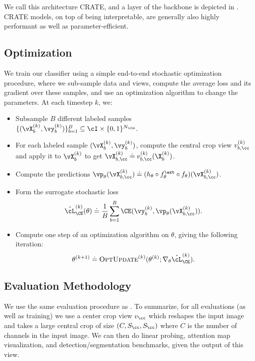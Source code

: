 \documentclass[../../book-main.tex]{subfiles}
\begin{document}
We call this architecture CRATE, and a layer of the backbone is depicted in . CRATE models, on top of being interpretable, are generally also highly performant as well as parameter-efficient. 

\subsection{Optimization} \label{sub:image_classification_optimization}

We train our classifier using a simple end-to-end stochastic optimization procedure, where we sub-sample data and views, compute the average loss and its gradient over these samples, and use an optimization algorithm to change the parameters. At each timestep \(k\), we:
\begin{itemize}
    \item Subsample \(B\) different labeled samples \(\{(\vX_{b}^{(k)}, \vy_{b}^{(k)})\}_{b = 1}^{B} \subseteq \cI \times \{0, 1\}^{N_{\cls}}\).
    \item For each labeled sample \((\vX_{b}^{(k)}, \vy_{b}^{(k)})\), compute the central crop view \(v_{b, \cc}^{(k)}\) and apply it to \(\vX_{b}^{(k)}\) to get \(\vX_{b, \cc}^{(k)} \doteq v_{b, \cc}^{(k)}(\X_{b}^{(k)})\).
    \item Compute the predictions \(\vp_{\theta}(\vX_{b, \cc}^{(k)}) \doteq (h_{\theta} \circ f_{\theta}^{\ext} \circ f_{\theta})(\vX_{b, \cc}^{(k)})\).
    \item Form the surrogate stochastic loss 
    \begin{equation}
        \hat{\cL}_{\CE}^{(k)}(\theta) \doteq \frac{1}{B}\sum_{b = 1}^{B}\CE(\vy_{b}^{(k)}, \vp_{\theta}(\vX_{b, \cc}^{(k)})).
    \end{equation}
    \item Compute one step of an optimization algorithm on \(\theta\), giving the following iteration:
    \begin{equation}
        \theta^{(k + 1)} \doteq \textsc{OptUpdate}^{(k)}(\theta^{(k)}; \nabla_{\theta}\hat{\cL}_{\CE}^{(k)}).
    \end{equation}
\end{itemize}


\subsection{Evaluation Methodology} \label{sub:image_classification_evals}

We use the same evaluation procedure as . To summarize, for all evaluations (as well as training) we use a center crop view \(v_{\cc}\) which reshapes the input image and takes a large central crop of size \((C, S_{\cc}, S_{\cc})\) where \(C\) is the number of channels in the input image. We can then do linear probing, attention map visualization, and detection/segmentation benchmarks, given the output of this view.
\end{document}
